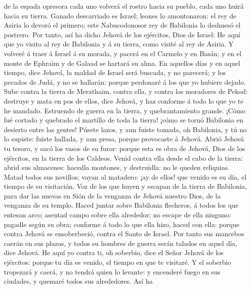 de la espada opresora cada uno volverá el rostro hacia su pueblo, cada
uno huirá hacia su tierra.  Ganado descarriado es Israel;
leones lo amontonaron: el rey de Asiria lo devoró el primero; este
Nabucodonosor rey de Babilonia lo deshuesó el postrero. 
Por tanto, así ha dicho Jehová de los ejércitos, Dios de Israel: He aquí
que yo visito al rey de Babilonia y á su tierra, como visité al rey de
Asiria.  Y volveré á traer á Israel á su morada, y pacerá
en el Carmelo y en Basán; y en el monte de Ephraim y de Galaad se
hartará su alma.  En aquellos días y en aquel tiempo,
dice Jehová, la maldad de Israel será buscada, y no parecerá; y los
pecados de Judá, y no se hallarán: porque perdonaré á los que yo hubiere
dejado.  Sube contra la tierra de Merathaim, contra ella,
y contra los moradores de Pekod: destruye y mata en pos de ellos, dice
Jehová, y haz conforme á todo lo que yo te he mandado. 
Estruendo de guerra en la tierra, y quebrantamiento grande.
 ¡Cómo fué cortado y quebrado el martillo de toda la
tierra! ¡cómo se tornó Babilonia en desierto entre las gentes!
 Púsete lazos, y aun fuiste tomada, oh Babilonia, y tú no
lo supiste: fuiste hallada, y aun presa, porque provocaste á Jehová.
 Abrió Jehová tu tesoro, y sacó los vasos de su furor:
porque esta es obra de Jehová, Dios de los ejércitos, en la tierra de
los Caldeos.  Venid contra ella desde el cabo de la
tierra: abrid sus almacenes: hacedla montones, y destruidla: no le
queden reliquias.  Matad todos sus novillos; vayan al
matadero: ¡ay de ellos! que venido es su día, el tiempo de su
visitación.  Voz de los que huyen y escapan de la tierra
de Babilonia, para dar las nuevas en Sión de la venganza de Jehová
nuestro Dios, de la venganza de su templo.  Haced juntar
sobre Babilonia flecheros, á todos los que entesan arco; asentad campo
sobre ella alrededor; no escape de ella ninguno: pagadle según su obra;
conforme á todo lo que ella hizo, haced con ella: porque contra Jehová
se ensoberbeció, contra el Santo de Israel.  Por tanto
sus mancebos caerán en sus plazas, y todos su hombres de guerra serán
talados en aquel día, dice Jehová.  He aquí yo contra ti,
oh soberbio, dice el Señor Jehová de los ejércitos: porque tu día es
venido, el tiempo en que te visitaré.  Y el soberbio
tropezará y caerá, y no tendrá quien lo levante: y encenderé fuego en
sus ciudades, y quemaré todos sus alrededores.  Así ha
